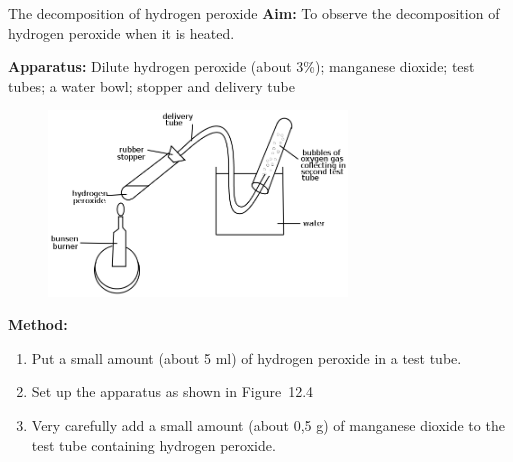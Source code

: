            \begin{g_experiment}{The decomposition of hydrogen peroxide}
            \nopagebreak
            \label{m38709*id63175}\noindent{}\textbf{Aim:}\newline
    To observe the decomposition of hydrogen peroxide when it is heated.\par 
        \label{m38709*id63194}\noindent{}\textbf{Apparatus:}\newline
    Dilute hydrogen peroxide (about 3\%); manganese dioxide; test tubes; a water bowl; stopper and delivery tube\par 
        \label{m38709*eip-470}
	\par
      \label{m38709*id63199}
    \setcounter{subfigure}{0}
	\begin{figure}[H] %
    \begin{center}
    \label{m38709*id63200!!!underscore!!!media}\label{m38709*id63200!!!underscore!!!printimage}\includegraphics[width=300px]{col11305.imgs/m38709_CG10C4_004.png} %
      \vspace{2pt}
    \vspace{.1in}
    \end{center}
 \end{figure}       
        \par 
        \label{m38709*id63206}\noindent{}\textbf{Method:}\label{m38709*id63212}\begin{enumerate}[noitemsep, label=\textbf{\arabic*}. ] 
            \label{m38709*uid11}\item Put a small amount (about 5 ml) of hydrogen peroxide in a test tube.
\label{m38709*uid12}\item Set up the apparatus as shown in Figure~12.4
\label{m38709*uid13}\item Very carefully add a small amount (about 0,5 g) of manganese dioxide to the test tube containing hydrogen peroxide. 

\end{enumerate}
\end{g_experiment}
